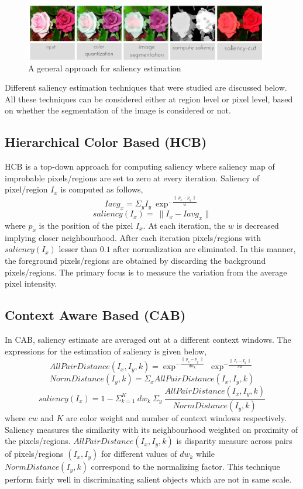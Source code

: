 \begin{figure}[htpb]
   \begin{center}
	    \includegraphics[width=0.95\textwidth]{snaps/sal/saliency.eps}     
     \caption {A general approach for saliency estimation}
   \label{fig:salap}
   \end{center}
 \end{figure}

\par Different saliency estimation techniques that were studied are discussed below.  All these techniques can be considered either at region level or pixel level, based on whether the segmentation of the image is considered or not.

\subsection{Hierarchical Color Based (HCB)}
HCB is a top-down approach for computing saliency where saliency map of improbable pixels/regions are set to zero at every iteration.  Saliency of pixel/region $I_{x}$ is computed as follows,
$$ Iavg_{x} = \Sigma_{y} I_{y}~\exp^{-\frac{\parallel~p_{x} - p_{y}~\parallel}{w}}  $$
$$ saliency(I_{x}) =~\parallel I_{x} - Iavg_{x} \parallel $$
where $p_{x}$ is the position of the pixel $I_{x}$.  At each iteration, the $w$ is decreased implying closer neighbourhood.  After each iteration pixels/regions with $ saliency(I_{x})$ lesser than $0.1$ after normalization are eliminated.  In this manner, the foreground pixels/regions are obtained by discarding the background pixels/regions.  The primary focus is to measure the variation from the average pixel intensity.

\subsection{Context Aware Based (CAB)}
In CAB, saliency estimate are averaged out at a different context windows.  The expressions for the estimation of saliency is given below,
$$ AllPairDistance(I_{x},I_{y},k) = \exp^{-\frac{\parallel~p_x - p_y~\parallel}{dw_k}}~\exp^{-\frac{\parallel~I_{x} - I_{y}~\parallel}{cw}}$$
$$ NormDistance(I_{y},k) = \Sigma_{x} AllPairDistance(I_{x},I_{y},k)$$
$$ saliency(I_{x}) = 1- \Sigma^{K}_{k=1}~dw_{k}~\Sigma_{y}~\frac{AllPairDistance(I_{x},I_{y},k)}{NormDistance(I_{y},k)}$$
where $cw$ and $K$ are color weight and number of context windows respectively.  Saliency measures the similarity with its neighbourhood weighted on proximity of the pixels/regions. $AllPairDistance(I_{x},I_{y},k)$ is disparity measure across pairs of pixels/regions $(I_{x},I_{y})$ for different values of $dw_{k}$ while $NormDistance(I_{y},k)$ correspond to the normalizing factor. This technique perform fairly well in discriminating salient objects which are not in same scale.

